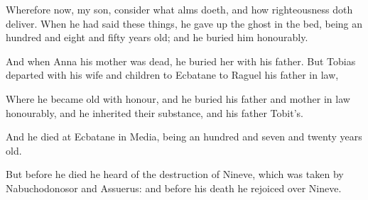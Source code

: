 {\par }{\PP {}Wherefore now, my son, consider what alms doeth, and how righteousness doth deliver. When he had said these things, he gave up the ghost in the bed, being an hundred and eight and fifty years old; and he buried him honourably.
\par }{\PP {}And when Anna his mother was dead, he buried her with his father. But Tobias departed with his wife and children to Ecbatane to Raguel his father in law,
\par }{\PP {}Where he became old with honour, and he buried his father and mother in law honourably, and he inherited their substance, and his father Tobit’s.
\par }{\PP {}And he died at Ecbatane in Media, being an hundred and seven and twenty years old.
\par }{\PP {}But before he died he heard of the destruction of Nineve, which was taken by Nabuchodonosor and Assuerus: and before his death he rejoiced over Nineve.
\par }